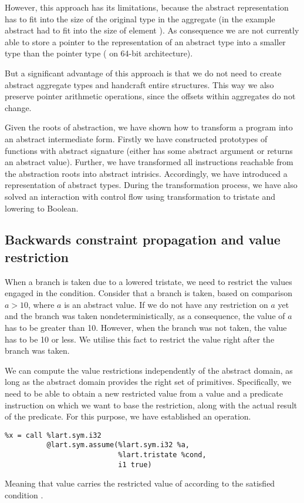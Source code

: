 However, this approach has its limitations, because the abstract representation
has to fit into the size of the original type in the aggregate (in the example
abstract  had to fit into the size of element ). As consequence
we are not currently able to store a pointer to the representation of an abstract type
into a smaller type than the pointer type ( on 64-bit
architecture).

But a significant advantage of this approach is that we do not need to create
abstract aggregate types and handcraft entire structures. This way we also
preserve pointer arithmetic operations, since the offsets within
aggregates do not change.

\begin{summary}
Given the roots of abstraction, we have shown how to transform a program into an
abstract intermediate form. Firstly we have constructed prototypes of
functions with abstract signature (either has some abstract argument or
returns an abstract value). Further, we have transformed all instructions
reachable from the abstraction roots into abstract intrisics. Accordingly, we
have introduced a representation of abstract types. During the transformation
process, we have also solved an interaction with control flow using
transformation to tristate and lowering to \LLVM Boolean.
\end{summary}

\subsection{Backwards constraint propagation and value restriction}
\label{sec:bcp}
When a branch is taken due to a lowered tristate, we need to restrict the values
engaged in the condition. Consider that a branch is taken, based on comparison $a
> 10$, where $a$ is an abstract value. If we do not have any restriction on $a$
yet and the branch was taken nondeterministically, as a consequence, the value of $a$
has to be greater than 10. However, when the branch was not taken,
the value has to be 10 or less. We utilise this fact to restrict the value
right after the branch was taken.

We can compute the value restrictions independently of the abstract domain, as
long as the abstract domain provides the right set of primitives. Specifically, we
need to be able to obtain a new restricted value from a value and a predicate
instruction on which we want to base the restriction, along with the actual
result of the predicate. For this purpose, we have established
an  operation.
\begin{verbatim}
%x = call %lart.sym.i32
          @lart.sym.assume(%lart.sym.i32 %a,
                           %lart.tristate %cond,
                           i1 true)
\end{verbatim}
Meaning that value  carries the restricted value of 
according to the satisfied condition .


